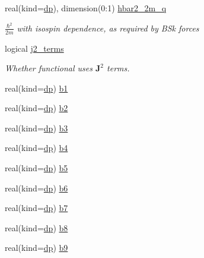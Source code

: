 \begin{DoxyCompactItemize}
real(kind=\mbox{\hyperlink{namespaceparameters_a52f8c6351fd79345d8811e065bcbbb37}{dp}}), dimension(0\+:1) \mbox{\hyperlink{group__SKYRME__PARS_ga8eaaa7306780e89ea9299163596ebc7f}{hbar2\+\_\+2m\+\_\+q}}
\begin{DoxyCompactList}\small\item\em $\frac{\hbar^2}{2m}$ with isospin dependence, as required by B\+Sk forces \end{DoxyCompactList}\item 
logical \mbox{\hyperlink{group__SKYRME__PARS_ga8d1441b6c74260a2058e73213ae60941}{j2\+\_\+terms}}
\begin{DoxyCompactList}\small\item\em Whether functional uses $\textbf{J}^2$ terms. \end{DoxyCompactList}\item 
real(kind=\mbox{\hyperlink{namespaceparameters_a52f8c6351fd79345d8811e065bcbbb37}{dp}}) \mbox{\hyperlink{group__SKYRME__COEFFS_ga370f8790e2b550acb651df944341c38a}{b1}}
\item 
real(kind=\mbox{\hyperlink{namespaceparameters_a52f8c6351fd79345d8811e065bcbbb37}{dp}}) \mbox{\hyperlink{group__SKYRME__COEFFS_gafeab3f7d25c9403fc9278f88e131e394}{b2}}
\item 
real(kind=\mbox{\hyperlink{namespaceparameters_a52f8c6351fd79345d8811e065bcbbb37}{dp}}) \mbox{\hyperlink{group__SKYRME__COEFFS_ga9b2ac7e2a2fd38fad3f2d4aa9eb74827}{b3}}
\item 
real(kind=\mbox{\hyperlink{namespaceparameters_a52f8c6351fd79345d8811e065bcbbb37}{dp}}) \mbox{\hyperlink{group__SKYRME__COEFFS_gaa0e98c8120ce5a6ee2c59e99e54b1564}{b4}}
\item 
real(kind=\mbox{\hyperlink{namespaceparameters_a52f8c6351fd79345d8811e065bcbbb37}{dp}}) \mbox{\hyperlink{group__SKYRME__COEFFS_ga86d34226c6b6f89e732f7acb9d6fc53d}{b5}}
\item 
real(kind=\mbox{\hyperlink{namespaceparameters_a52f8c6351fd79345d8811e065bcbbb37}{dp}}) \mbox{\hyperlink{group__SKYRME__COEFFS_ga375601587cabd94f376823158f6b3573}{b6}}
\item 
real(kind=\mbox{\hyperlink{namespaceparameters_a52f8c6351fd79345d8811e065bcbbb37}{dp}}) \mbox{\hyperlink{group__SKYRME__COEFFS_ga93c2fa7fcb7fac6304867a02d6fb21c3}{b7}}
\item 
real(kind=\mbox{\hyperlink{namespaceparameters_a52f8c6351fd79345d8811e065bcbbb37}{dp}}) \mbox{\hyperlink{group__SKYRME__COEFFS_ga9b6e33a75b631e3ba0f050460ffd5895}{b8}}
\item 
real(kind=\mbox{\hyperlink{namespaceparameters_a52f8c6351fd79345d8811e065bcbbb37}{dp}}) \mbox{\hyperlink{group__SKYRME__COEFFS_ga78905f183069e7fb9d101ae402ddd299}{b9}}

\end{DoxyCompactItemize}
